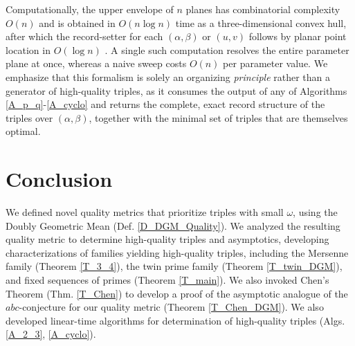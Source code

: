 \documentclass[11pt,letterpaper]{amsart}
\newtheorem{definition}[theorem]{Definition}
\begin{document}
  Computationally, the upper envelope of $n$ planes has combinatorial complexity $O(n)$ and is
  obtained in $O(n\log n)$ time as a three-dimensional convex hull, after which the record-setter for each $(\alpha,\beta)$ or $(u, v)$ follows by planar point location in $O(\log n)$ \cite{deberg2008}. A single such computation resolves the entire parameter plane at once, whereas a naive sweep costs $O(n)$ per parameter value. We emphasize that this formalism is solely an organizing \textit{principle} rather than a generator of high-quality triples, as it consumes the output of any of Algorithms \ref{A_p_q}-\ref{A_cyclo} and returns the complete, exact record structure of the triples over $(\alpha,\beta)$, together with the minimal set of triples that are themselves optimal.

\section{Conclusion}
We defined novel quality metrics that prioritize triples with small $\omega$, using the Doubly Geometric Mean (Def. \ref{D_DGM_Quality}). We analyzed the resulting quality metric to determine high-quality triples and asymptotics, developing characterizations of families yielding high-quality triples, including the Mersenne family (Theorem \ref{T_3_4}), the twin prime family (Theorem \ref{T_twin_DGM}), and fixed sequences of primes (Theorem \ref{T_main}). We also invoked Chen's Theorem (Thm. \ref{T_Chen}) to develop a proof of the asymptotic analogue of the $abc$-conjecture for our quality metric (Theorem \ref{T_Chen_DGM}). We also developed linear-time algorithms for determination of high-quality triples (Algs. \ref{A_2_3}, \ref{A_cyclo}).
\end{document}

